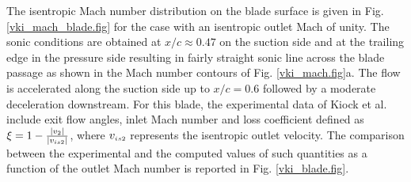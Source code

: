  The isentropic Mach number distribution on the blade surface is given in
 Fig. \ref{vki_mach_blade.fig} for the case with an isentropic outlet Mach
 of unity. The sonic conditions are obtained at $x/c \approx 0.47$
 on the suction side and at the trailing edge in the pressure side
 resulting in fairly straight sonic line across the blade passage as
 shown in the Mach number contours of Fig. \ref{vki_mach.fig}a.
 The flow is accelerated along the suction side up to $x/c = 0.6$ followed
 by a moderate deceleration downstream.
 For this blade, the experimental data of
 Kiock et al. \citeyear{Kiock:1} include exit flow angles, inlet Mach number
 and loss coefficient defined as
 $\xi = 1 - \frac{\left|v_{\mbox{\tiny $2$}}\right|}{\left|v_{\mbox{\tiny $is2$}}\right|}$, where
 $v_{\mbox{\tiny $is2$}}$ represents the isentropic outlet velocity. The comparison
 between the experimental and the computed values of such quantities as a
 function of the outlet Mach number is reported in Fig. \ref{vki_blade.fig}.
%
%
